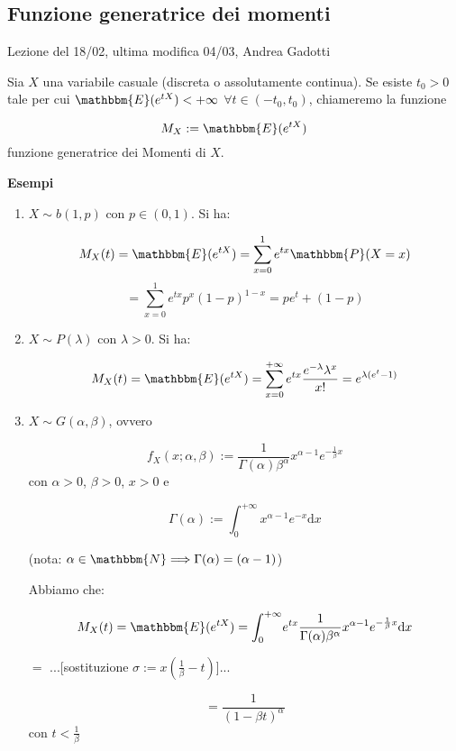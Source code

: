 
\subsection{Funzione generatrice dei momenti}
Lezione del 18/02, ultima modifica 04/03, Andrea Gadotti

\begin{definizione}
Sia $X$ una variabile casuale (discreta o assolutamente continua). Se esiste $t_0 > 0$ tale per cui $\mathbbm{E}(e^{tX}) < +\infty$ $\forall t \in (-t_0 , t_0)$, chiameremo la funzione 

$$M_X := \mathbbm{E}(e^{tX})$$
funzione generatrice dei Momenti di $X$.
\end{definizione}
\textbf{Esempi}
\begin{enumerate}
\item $X \sim b(1,p)$ con $p \in (0,1)$. Si ha:

$$M_X (t) 	= \mathbbm{E}(e^{tX}) 
			= \displaystyle\sum_{x=0}^1 e^{tx} \mathbbm{P}(X=x)$$
$$
			= \displaystyle\sum_{x=0}^1 e^{tx} p^x (1-p)^{1-x}
			= p e^t + (1-p)$$	


\item $X \sim P(\lambda)$ con $\lambda > 0$. Si ha:

$$M_X (t) 	= \mathbbm{E}(e^{tX}) 
			= \displaystyle\sum_{x=0}^{+\infty} e^{tx} \frac{e^{-\lambda} \lambda^x}{x!}
			= e^{\lambda (e^t -1)}$$
			
			
\item $X \sim G(\alpha, \beta)$, ovvero 

$$f_X (x; \alpha, \beta) := \frac{1}{\Gamma (\alpha) \beta^{\alpha}} x^{\alpha -1} e^{-\frac{1}{\beta} x}$$ con $\alpha>0$, $\beta>0$, $x>0$ e 

$$\Gamma(\alpha) := \int_0^{+\infty} \! x^{\alpha -1} e^{-x} \mathrm{d}x$$ 

(nota: $\alpha \in \mathbbm{N} \Longrightarrow \Gamma(\alpha)=(\alpha - 1)$)

Abbiamo che: 

$$M_X (t)	= \mathbbm{E}(e^{tX})
			= \int_0^{+\infty} \! e^{tx} \frac{1}{\Gamma (\alpha) \beta^{\alpha}} x^{\alpha -1} e^{-\frac{1}{\beta} x} \mathrm{d}x$$
\begin{center} $=$ ...[sostituzione $\sigma := x(\frac{1}{\beta} - t)$]...  \end{center}
			$$= \frac{1}{(1-\beta t)^{\alpha}}$$ con $t < \frac{1}{\beta}$
			
\end{enumerate}

